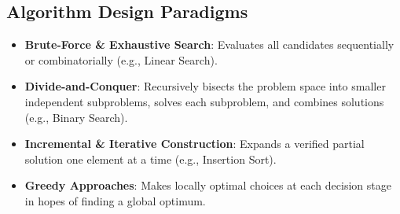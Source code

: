 \subsection{Algorithm Design Paradigms}
\begin{itemize}
    \item \textbf{Brute-Force \& Exhaustive Search}: Evaluates all candidates sequentially or combinatorially (e.g., Linear Search).
    \item \textbf{Divide-and-Conquer}: Recursively bisects the problem space into smaller independent subproblems, solves each subproblem, and combines solutions (e.g., Binary Search).
    \item \textbf{Incremental \& Iterative Construction}: Expands a verified partial solution one element at a time (e.g., Insertion Sort).
    \item \textbf{Greedy Approaches}: Makes locally optimal choices at each decision stage in hopes of finding a global optimum.
\end{itemize}
